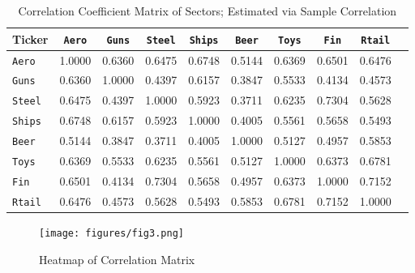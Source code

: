 \documentclass[10 pt]{hwtemplate} %
\begin{document}
\begin{table}[htbp]
  \begin{center}
  \captionsetup{justification=centering}
  \caption{\label{tab:mean}Correlation Coefficient Matrix of Sectors; Estimated via Sample Correlation}
  \small
    \begin{tabular}{lccccccccc}
    \toprule
      Ticker & \texttt{Aero} & \texttt{Guns} & \texttt{Steel}& \texttt{Ships}& \texttt{Beer}& \texttt{Toys}& \texttt{Fin}&  \texttt{Rtail}\\
      \midrule
      \texttt{Aero}&1.0000 & 0.6360 & 0.6475 & 0.6748 & 0.5144 & 0.6369 & 0.6501 & 0.6476 \\
      \texttt{Guns}&0.6360 & 1.0000 & 0.4397 & 0.6157 & 0.3847 & 0.5533 & 0.4134 & 0.4573 \\
      \texttt{Steel}&0.6475 & 0.4397 & 1.0000 & 0.5923 & 0.3711 & 0.6235 & 0.7304 & 0.5628 \\
      \texttt{Ships}&0.6748 & 0.6157 & 0.5923 & 1.0000 & 0.4005 & 0.5561 & 0.5658 & 0.5493 \\
      \texttt{Beer}&0.5144 & 0.3847 & 0.3711 & 0.4005 & 1.0000 & 0.5127 & 0.4957 & 0.5853 \\
      \texttt{Toys}&0.6369 & 0.5533 & 0.6235 & 0.5561 & 0.5127 & 1.0000 & 0.6373 & 0.6781 \\
      \texttt{Fin}&0.6501 & 0.4134 & 0.7304 & 0.5658 & 0.4957 & 0.6373 & 1.0000 & 0.7152 \\
      \texttt{Rtail}&0.6476 & 0.4573 & 0.5628 & 0.5493 & 0.5853 & 0.6781 & 0.7152 & 1.0000 \\
    \bottomrule
    \end{tabular}
  \end{center}
\end{table}

\begin{figure}[H]
  \centering
  \captionsetup{justification=centering}
  \caption{\label{fig:exretcorr}Heatmap of Correlation Matrix}
  \vspace{-10pt}
  \texttt{[image: figures/fig3.png]}
\end{figure}
\end{document}
